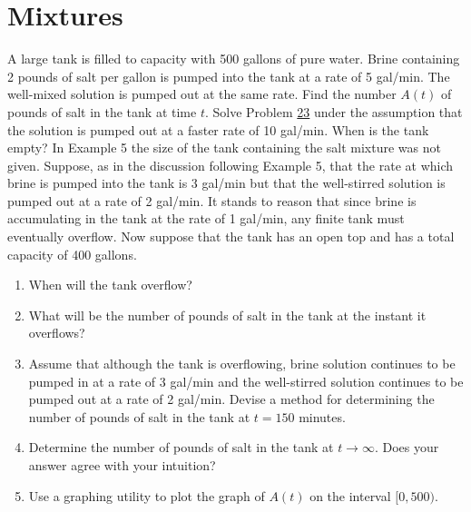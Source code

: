 \documentclass[12pt]{report}
\begin{document}
\section{Mixtures}\label{sec:mixtures}
\begin{enumerate}[label=\arabic*., start=23]
	\label{prb:23} A large tank is filled to capacity with 500 gallons of pure water. Brine containing 2 pounds of salt per gallon is pumped into the tank at a rate of 5 gal/min. The well-mixed solution is pumped out at the same rate. Find the number $A(t)$ of pounds of salt in the tank at time $t$.
	\setcounter{enumi}{24}
	 Solve Problem \hyperref[prb:23]{23} under the assumption that the solution is pumped out at a faster rate of 10 gal/min. When is the tank empty?
	\setcounter{enumi}{27}
	 In Example 5 the size of the tank containing the salt mixture was not given. Suppose, as in the discussion following Example 5, that the rate at which brine is pumped into the tank is 3 gal/min but that the well-stirred solution is pumped out at a rate of 2 gal/min. It stands to reason that since brine is accumulating in the tank at the rate of 1 gal/min, any finite tank must eventually overflow. Now suppose that the tank has an open top and has a total capacity of 400 gallons.
	\begin{enumerate}[label=(\alph*)]
	    \item When will the tank overflow?
		\item What will be the number of pounds of salt in the tank at the instant it overflows?
		\item Assume that although the tank is overflowing, brine solution continues to be pumped in at a rate of 3 gal/min and the well-stirred solution continues to be pumped out at a rate of 2 gal/min. Devise a method for determining the number of pounds of salt in the tank at $t=150$ minutes.
		\item Determine the number of pounds of salt in the tank at $t\rightarrow\infty$. Does your answer agree with your intuition?
		\item Use a graphing utility to plot the graph of $A(t)$ on the interval $[0, 500)$.
	\end{enumerate}
\end{enumerate}
\end{document}
